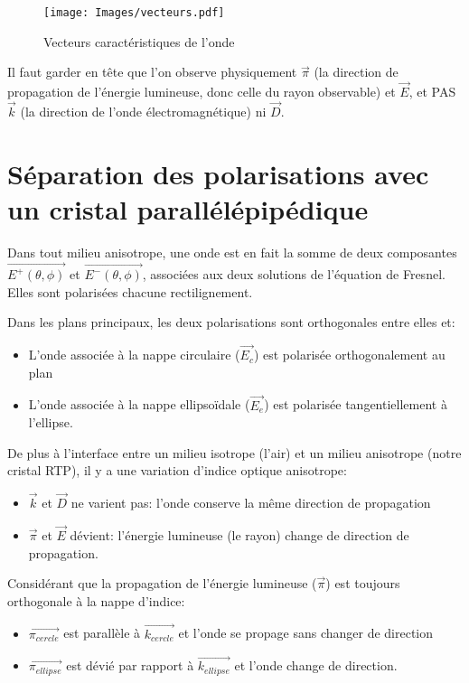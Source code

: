 \documentclass[a4paper,11pt]{report}
\begin{document}
\begin{figure}[h]
    \begin{center}
        \texttt{[image: Images/vecteurs.pdf]}
        \caption{Vecteurs caractéristiques de l'onde}
        \label{vecteurs}
    \end{center}
\end{figure}


Il faut garder en tête que l'on observe physiquement $\vec{\pi}$ (la direction de propagation de l'énergie lumineuse, donc celle du rayon observable) et $\vec{E}$, et PAS $\vec{k}$ (la direction de l'onde électromagnétique) ni $\vec{D}$.

\section{Séparation des polarisations avec un cristal parallélépipédique}
Dans tout milieu anisotrope, une onde est en fait la somme de deux composantes $\vec{E^+(\theta,\phi)}$ et $\vec{E^-(\theta,\phi)}$, associées aux deux solutions de l'équation de Fresnel. Elles sont polarisées chacune rectilignement.

Dans les plans principaux, les deux polarisations sont orthogonales entre elles et:
\begin{itemize}
    \item L'onde associée à la nappe circulaire ($\vec{E_c}$) est polarisée orthogonalement au plan
    \item L'onde associée à la nappe ellipsoïdale ($\vec{E_e}$) est polarisée tangentiellement à l'ellipse.
\end{itemize}

\newpage
De plus à l'interface entre un milieu isotrope (l'air) et un milieu anisotrope (notre cristal RTP), il y a une variation d'indice optique anisotrope:
\begin{itemize}
    \item $\vec{k}$ et $\vec{D}$ ne varient pas: l'onde conserve la même direction de propagation
    \item $\vec{\pi}$ et $\vec{E}$ dévient: l'énergie lumineuse (le rayon) change de direction de propagation.\newline
\end{itemize}

Considérant que la propagation de l'énergie lumineuse ($\vec{\pi}$) est toujours orthogonale à la nappe d'indice:
\begin{itemize}
    \item $\vec{\pi_{cercle}}$ est parallèle à $\vec{k_{cercle}}$ et l'onde se propage sans changer de direction
    \item $\vec{\pi_{ellipse}}$ est dévié par rapport à $\vec{k_{ellipse}}$ et l'onde change de direction.
\end{itemize}
\end{document}
